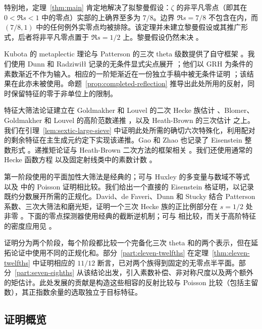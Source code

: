 特别地，定理~\ref{thm:main} 肯定地解决了拟黎曼假设：$\zeta$ 的非平凡零点（即其在 $0<\Re s<1$ 中的零点）实部的上确界至多为 $7/8$。边界 $\Re s=7/8$ 不包含在内，而 $(7/8,1)$ 中的任何例外实零点均被排除。该定理并未建立黎曼假设或其推广形式，后者将非平凡零点置于 $\Re s=1/2$ 上。黎曼假设仍然未决 \cite{Clay}。

Kubota 的 metaplectic 理论与 Patterson 的三次 theta 级数提供了自守框架 \cite{Kubota,Patterson}。我们使用 Dunn 和 Radziwi\l\l{} 记录的无条件显式尖点展开 \cite[第 5 节与附录 A]{DR}；他们以 GRH 为条件的素数渐近不作为输入。相应的一阶矩渐近在一份独立手稿中被无条件证明 \cite[定理~1.1]{OpenAICubicFirstMoment}；该结果在此亦未被使用。命题~\ref{prop:completed-reflection} 推导出此处所用的反射，同时保留特征的零于非单位上的限制。

特征大筛法论证建立在 Goldmakher 和 Louvel 的二次 Hecke 族估计 \cite[定义 1 与定理 1.1]{GL}、Blomer、Goldmakher 和 Louvel 的高阶范数递推 \cite[定理 1.3 与第 3 节]{BGL}，以及 Heath-Brown 的三次估计 \cite[定理 2]{HB} 之上。我们在引理~\ref{lem:sextic-large-sieve} 中证明此处所需的确切六次特殊化，利用配对的剩余特征在主生成元约定下实现该递推。Gao 和 Zhao 也记录了 Eisenstein 整数形式 \cite[引理 2.9]{GZSextic}。递推矩论证与 Heath-Brown 二次方法的框架相关 \cite[第 2 节]{HBQuadratic}。我们还使用通常的 Hecke 函数方程 \cite[方程 (1.1)]{GZ} 以及固定射线类中的素数计数 \cite[定理 1.1]{TZ}。

第一阶段使用的平面加性大筛法是经典的；可与 Huxley 的多变量与数域不等式 \cite{Huxley} 以及 \cite[第 3 节，定理 3]{BaierBansal} 中的 Poisson 证明相比较。我们给出一个直接的 Eisenstein 格证明，以记录既约分数展开所需的正规化。David、de Faveri、Dunn 和 Stucky 结合 Patterson 系数、三次大筛法和磨光矩，证明一个三次 Hecke 族的正比例部分在 $s=1/2$ 处非零 \cite[定理 1.1 与第 1.2 节]{DFDS}。下面的零点探测器使用经典的截断逆机制；可与 \cite[附录 C]{MP} 相比较，而关于高阶特征的密度应用见 \cite[推论 1.6 与第 5 节]{BGL}。

证明分为两个阶段，每个阶段都比较一个完备化三次 theta 和的两个表示，但在延拓论证中使用不同的正规化和。部分~\ref{part:eleven-twelfths} 在定理~\ref{thm:eleven-twelfths} 中证明相应的 $11/12$ 断言，已对两个族得到固定的无零点半平面。部分~\ref{part:seven-eighths} 从该结论出发，引入素数补偿、非对称尺度以及两个额外的矩估计。此处发展的贡献是构造这些相容的反射比较与 Poisson 比较（包括主留数），其正指数余量的选取独立于目标特征。

\subsection*{证明概览}

